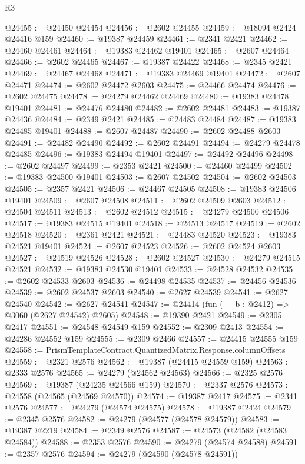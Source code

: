 \begin{lexlean}{R3}
\begin{coremodule}
@24455 := @24450 @24454
@24456 := @2602 @24455
@24459 := @18094 @2424 @24416 @159
@24460 := @19387 @24459
@24461 := @2341 @2421
@24462 := @24460 @24461
@24464 := @19383 @24462 @19401
@24465 := @2607 @24464
@24466 := @2602 @24465
@24467 := @19387 @24422
@24468 := @2345 @2421
@24469 := @24467 @24468
@24471 := @19383 @24469 @19401
@24472 := @2607 @24471
@24474 := @2602 @24472 @2603
@24475 := @24466 @24474
@24476 := @2602 @24475
@24478 := @24279 @24462 @24469
@24480 := @19383 @24478 @19401
@24481 := @24476 @24480
@24482 := @2602 @24481
@24483 := @19387 @24436
@24484 := @2349 @2421
@24485 := @24483 @24484
@24487 := @19383 @24485 @19401
@24488 := @2607 @24487
@24490 := @2602 @24488 @2603
@24491 := @24482 @24490
@24492 := @2602 @24491
@24494 := @24279 @24478 @24485
@24496 := @19383 @24494 @19401
@24497 := @24492 @24496
@24498 := @2602 @24497
@24499 := @2353 @2421
@24500 := @24460 @24499
@24502 := @19383 @24500 @19401
@24503 := @2607 @24502
@24504 := @2602 @24503
@24505 := @2357 @2421
@24506 := @24467 @24505
@24508 := @19383 @24506 @19401
@24509 := @2607 @24508
@24511 := @2602 @24509 @2603
@24512 := @24504 @24511
@24513 := @2602 @24512
@24515 := @24279 @24500 @24506
@24517 := @19383 @24515 @19401
@24518 := @24513 @24517
@24519 := @2602 @24518
@24520 := @2361 @2421
@24521 := @24483 @24520
@24523 := @19383 @24521 @19401
@24524 := @2607 @24523
@24526 := @2602 @24524 @2603
@24527 := @24519 @24526
@24528 := @2602 @24527
@24530 := @24279 @24515 @24521
@24532 := @19383 @24530 @19401
@24533 := @24528 @24532
@24535 := @2602 @24533 @2603
@24536 := @24498 @24535
@24537 := @24456 @24536
@24539 := @2602 @24537 @2603
@24540 := @2627 @24539
@24541 := @2627 @24540
@24542 := @2627 @24541
@24547 := @24414 (fun (__b : @2412) => @3060 (@2627 @24542) @2605)
@24548 := @19390 @2421
@24549 := @2305 @2417
@24551 := @24548 @24549 @159
@24552 := @2309 @2413
@24554 := @24286 @24552 @159
@24555 := @2309 @2466
@24557 := @24415 @24555 @159
@24558 := PrismTemplateContract.QuantizedMatrix.Response.columnOffsets
@24559 := @2321 @2576
@24562 := @19387 (@24415 @24559 @159)
@24563 := @2333 @2576
@24565 := @24279 (@24562 @24563)
@24566 := @2325 @2576
@24569 := @19387 (@24235 @24566 @159)
@24570 := @2337 @2576
@24573 := @24558 (@24565 (@24569 @24570))
@24574 := @19387 @2417
@24575 := @2341 @2576
@24577 := @24279 (@24574 @24575)
@24578 := @19387 @2424
@24579 := @2345 @2576
@24582 := @24279 (@24577 (@24578 @24579))
@24583 := @19387 @2219
@24584 := @2349 @2576
@24587 := @24573 (@24582 (@24583 @24584))
@24588 := @2353 @2576
@24590 := @24279 (@24574 @24588)
@24591 := @2357 @2576
@24594 := @24279 (@24590 (@24578 @24591))

\end{coremodule}
\end{lexlean}

